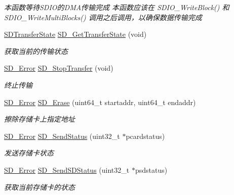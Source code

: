 \begin{DoxyCompactItemize}
\begin{DoxyCompactList}\small\item\em 本函数等待\+S\+D\+I\+O的\+D\+M\+A传输完成 本函数应该在 S\+D\+I\+O\+\_\+\+Write\+Block() 和 S\+D\+I\+O\+\_\+\+Write\+Multi\+Blocks() 调用之后调用，以确保数据传输完成 \end{DoxyCompactList}\item 
\hyperlink{group__sd__card_gace0484a459648257c3eae8ea60f64fbf}{S\+D\+Transfer\+State} \hyperlink{group__sd__card__private_ga2dd79455185c28bd21964d113a38d110}{S\+D\+\_\+\+Get\+Transfer\+State} (void)
\begin{DoxyCompactList}\small\item\em 获取当前的传输状态 \end{DoxyCompactList}\item 
\hyperlink{group__sd__card_gacff91fa68daa1d1ee967b5b3fb3dbd8c}{S\+D\+\_\+\+Error} \hyperlink{group__sd__card__private_gad3dc52f076ae8145e105cb4d8a37b043}{S\+D\+\_\+\+Stop\+Transfer} (void)
\begin{DoxyCompactList}\small\item\em 终止传输 \end{DoxyCompactList}\item 
\hyperlink{group__sd__card_gacff91fa68daa1d1ee967b5b3fb3dbd8c}{S\+D\+\_\+\+Error} \hyperlink{group__sd__card__private_gaca2450c63f52cd6c1d50f6de33ecfdf8}{S\+D\+\_\+\+Erase} (uint64\+\_\+t startaddr, uint64\+\_\+t endaddr)
\begin{DoxyCompactList}\small\item\em 擦除存储卡上指定地址 \end{DoxyCompactList}\item 
\hyperlink{group__sd__card_gacff91fa68daa1d1ee967b5b3fb3dbd8c}{S\+D\+\_\+\+Error} \hyperlink{group__sd__card__private_ga7de24baeb4c6a7c9e5668630b8797888}{S\+D\+\_\+\+Send\+Status} (uint32\+\_\+t $\ast$pcardstatus)
\begin{DoxyCompactList}\small\item\em 发送存储卡状态 \end{DoxyCompactList}\item 
\hyperlink{group__sd__card_gacff91fa68daa1d1ee967b5b3fb3dbd8c}{S\+D\+\_\+\+Error} \hyperlink{group__sd__card__private_gab573516bdaa3054877172415e66d0e57}{S\+D\+\_\+\+Send\+S\+D\+Status} (uint32\+\_\+t $\ast$psdstatus)
\begin{DoxyCompactList}\small\item\em 获取当前存储卡的状态 \end{DoxyCompactList}\item 

\end{DoxyCompactItemize}

